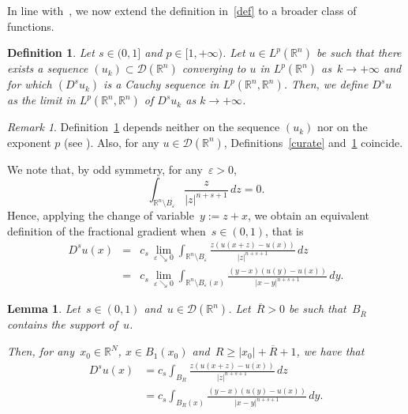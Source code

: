 \documentclass[11pt,hyp,]{nyjm}
\numberwithin{equation}{section}
\newcommand{\R}{\mathbb{R}}
\newtheorem{lemma}[theorem]{Lemma}
\newtheorem{definition}[theorem]{Definition}
\theoremstyle{remark}
\newtheorem{remark}[theorem]{Remark}
\renewcommand{\geq}{\geqslant}
\renewcommand{\epsilon}{\varepsilon}
\begin{document}
{I}n line with~\cite[Definition 2.2]{mora}, we now extend the definition in~\eqref{def} to a broader class of functions.
\begin{definition}\label{defini}
Let $s \in (0,1]$ and $p \in [1, +\infty)$.
Let $u \in L^p(\R^n)$ be such that there exists a sequence $(u_k) \subset \mathcal{D}(\R^n)$ converging to $u$ in $L^p(\R^n)$ as~$k\to+\infty$ and for which $(D^s u_k)$ is a Cauchy sequence in $L^p(\R^n, \R^n)$. 
Then, we define $D^s u$ as the limit in $L^p(\R^n, \R^n)$ of $D^s u_k$ as $k \to+ \infty$.
\end{definition} 
\begin{remark}
Definition~\ref{defini} depends neither on the sequence $(u_k)$ nor on the exponent $p$ (see \cite[Lemma 2.3]{mora}). Also, for any $u \in \mathcal{D}(\R^n)$, Definitions~\ref{curate} and~\ref{defini} coincide.
\end{remark}

We note that, by odd symmetry, for any~$\epsilon>0$,
			\begin{equation}\label{simzeromenomale09}
				\int_{\R^n \setminus B_{\epsilon}} \frac{z }{|z|^{n+s+1}} \, dz = 0.
			\end{equation}
Hence, applying the change of variable~$y:=z+x$, we obtain an equivalent definition of the fractional gradient when~$s \in (0,1)$, that is
			\begin{eqnarray*}
				D^s u (x) &=& c_{s}  \,\lim_{\epsilon \searrow 0} \int_{\R^n \setminus B_{\epsilon}} \frac{z (u(x+z)-u(x))}{|z|^{n+s+1}} \, dz  \\
				&=& c_{s}  \,\lim_{\epsilon \searrow 0} \int_{\R^n \setminus B_{\epsilon}(x)} \frac{(y-x) (u(y)-u(x))}{|x-y|^{n+s+1}} \, dy.
			\end{eqnarray*}
			
			\begin{lemma}\label{kj} Let~$s\in(0,1)$ and~$u \in \mathcal{D}(\R^n)$. Let~$\overline R >0$ be such that~$B_{\overline R}$ contains the support of~$u$.
				
				Then, for any~$x_0\in\R^N$,
				$x\in B_1(x_0)$ and~$R\geq |x_0|+ \overline R+1$, we have that
				\begin{equation}\begin{split}\label{hu43ty854b97689v6cb}
					D^su(x) &= c_s \int_{B_{R}}  \frac{z(u(x+z)-u(x))}{|z|^{n+s+1}} \, dz \\ &= c_s \int_{B_{R}(x)}  \frac{(y-x)(u(y)-u(x))}{|x-y|^{n+s+1}} \, dy.
				\end{split}\end{equation}				 
			\end{lemma}
			
\end{document}
